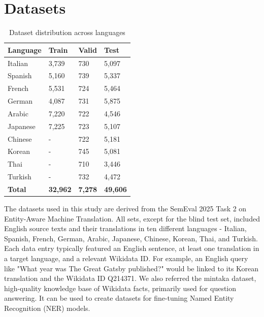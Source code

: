 \documentclass{ecai}
\begin{document}
\section{Datasets}
\label{sec:datasets}

\begin{table}[h!]
\centering
\begin{tabular}{ll@{\hspace{8mm}}ll}
\hline
\textbf{Language} & \textbf{Train} & \textbf{Valid} & \textbf{Test} \\
\hline
Italian & 3,739 & 730 & 5,097 \\
Spanish & 5,160 & 739 & 5,337 \\
French & 5,531 & 724 & 5,464 \\
German & 4,087 & 731 & 5,875 \\
Arabic & 7,220 & 722 & 4,546 \\
Japanese & 7,225 & 723 & 5,107 \\
Chinese & - & 722 & 5,181 \\
Korean & - & 745 & 5,081 \\
Thai & - & 710 & 3,446 \\
Turkish & - & 732 & 4,472 \\
\hline
\textbf{Total} & \textbf{32,962} & \textbf{7,278} & \textbf{49,606} \\
\hline
\end{tabular}
\caption{Dataset distribution across languages}
\label{tab:dataset_distribution}
\end{table}

The datasets used in this study are derived from the SemEval 2025 Task 2 on Entity-Aware Machine Translation.
All sets, except for the blind test set, included English source texts and their translations in ten 
different languages - Italian, Spanish, French, German, Arabic, Japanese, Chinese, Korean, Thai, and Turkish. 
Each data entry typically featured an English sentence, at least one translation in a target language, 
and a relevant Wikidata ID. 
For example, an English query like "What year was The Great Gatsby published?" 
would be linked to its Korean translation and the Wikidata ID Q214371. We also referred the mintaka\cite{sen-etal-2022-mintaka} dataset,
high-quality knowledge base of Wikidata facts, primarily used for question answering. It can be used to create
datasets for fine-tuning Named Entity Recognition (NER) models.

\end{document}
